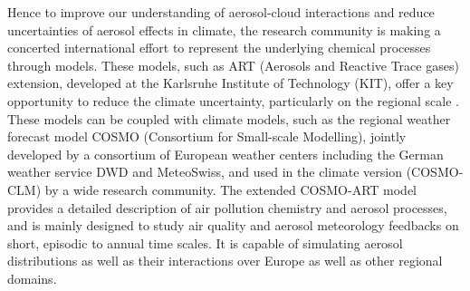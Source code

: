 Hence to  improve our understanding of  aerosol-cloud interactions and
reduce  uncertainties  of aerosol  effects  in  climate, the  research
community is making a  concerted international effort to represent the
underlying chemical  processes through models.  These  models, such as
ART (Aerosols  and Reactive Trace  gases) extension, developed  at the
Karlsruhe Institute  of Technology (KIT),  offer a key  opportunity to
reduce   the  climate  uncertainty,   particularly  on   the  regional
scale \citep{Knote-2011, Bangert-2011,  Knote-2013}.  These models can
be coupled with climate models,  such as the regional weather forecast
model COSMO (Consortium  for Small-scale Modelling), jointly developed
by  a consortium  of  European weather  centers  including the  German
weather service  DWD and MeteoSwiss,  and used in the  climate version
(COSMO-CLM)  by a  wide  research community.   The extended  COSMO-ART
model provides  a detailed description of air  pollution chemistry and
aerosol processes,  and is  mainly designed to  study air  quality and
aerosol  meteorology  feedbacks  on  short, episodic  to  annual  time
scales.  It is capable of  simulating aerosol distributions as well as
their interactions over Europe as well as other regional domains.

